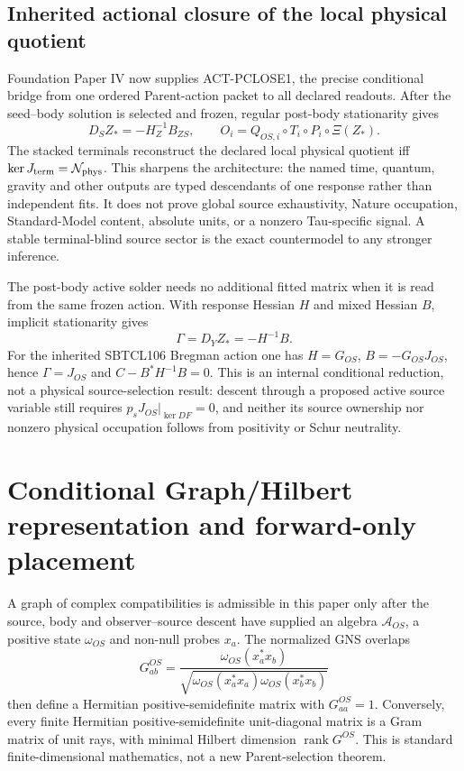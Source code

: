 \documentclass[11pt]{article}
\begin{document}
\subsection*{Inherited actional closure of the local physical quotient}

Foundation Paper IV now supplies ACT-PCLOSE1, the precise conditional bridge
from one ordered Parent-action packet to all declared readouts.  After the
seed--body solution is selected and frozen, regular post-body stationarity
gives
\[
 D_SZ_*=-H_Z^{-1}B_{ZS},
 \qquad O_i=Q_{OS,i}\circ T_i\circ P_i\circ\Xi(Z_*).
\]
The stacked terminals reconstruct the declared local physical quotient iff
$\ker J_{\rm term}=\mathcal N_{\rm phys}$.  This sharpens the architecture:
the named time, quantum, gravity and other outputs are typed descendants of
one response rather than independent fits.  It does not prove global source
exhaustivity, Nature occupation, Standard-Model content, absolute units, or a
nonzero Tau-specific signal.  A stable terminal-blind source sector is the
exact countermodel to any stronger inference.

The post-body active solder needs no additional fitted matrix when it is read
from the same frozen action.  With response Hessian $H$ and mixed Hessian
$B$, implicit stationarity gives
\begin{equation}
 \Gamma=D_YZ_*=-H^{-1}B.
 \label{eq:active-solder-mixed-hessian}
\end{equation}
For the inherited SBTCL106 Bregman action one has
$H=G_{OS}$, $B=-G_{OS}J_{OS}$, hence
$\Gamma=J_{OS}$ and $C-B^*H^{-1}B=0$.  This is an internal conditional
reduction, not a physical source-selection result: descent through a proposed
active source variable still requires
$p_sJ_{OS}|_{\ker DF}=0$, and neither its source ownership nor nonzero
physical occupation follows from positivity or Schur neutrality.

\section{Conditional Graph/Hilbert representation and forward-only placement}

A graph of complex compatibilities is admissible in this paper only after
the source, body and observer--source descent have supplied an algebra
$\mathcal A_{OS}$, a positive state $\omega_{OS}$ and non-null probes $x_a$.
The normalized GNS overlaps
\begin{equation}
 G^{OS}_{ab}=
 \frac{\omega_{OS}(x_a^*x_b)}
 {\sqrt{\omega_{OS}(x_a^*x_a)\omega_{OS}(x_b^*x_b)}}
 \label{eq:conditional-gns-gram}
\end{equation}
then define a Hermitian positive-semidefinite matrix with $G_{aa}^{OS}=1$.
Conversely, every finite Hermitian positive-semidefinite unit-diagonal matrix
is a Gram matrix of unit rays, with minimal Hilbert dimension
$\operatorname{rank}G^{OS}$.  This is standard finite-dimensional
mathematics, not a new Parent-selection theorem.
\end{document}
